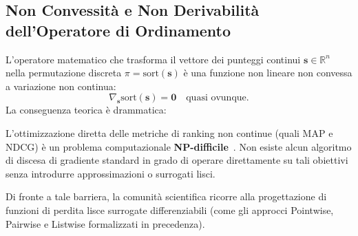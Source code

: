 \FloatBarrier
\subsection{Non Convessit\`a e Non Derivabilit\`a dell'Operatore di Ordinamento}
\label{subsec:non-convessita-non-derivabilita}
L'operatore matematico che trasforma il vettore dei punteggi continui $\mathbf{s} \in \mathbb{R}^n$ nella permutazione discreta $\pi = \text{sort}(\mathbf{s})$ \`e una funzione non lineare non convessa a variazione non continua:
\begin{equation}
\nabla_{\mathbf{s}} \text{sort}(\mathbf{s}) = \mathbf{0} \quad \text{quasi ovunque}.
\end{equation}
La conseguenza teorica \`e drammatica:
\begin{theorem}
L'ottimizzazione diretta delle metriche di ranking non continue (quali MAP e NDCG) \`e un problema computazionale \textbf{NP-difficile}~\cite{bruch2023}. Non esiste alcun algoritmo di discesa di gradiente standard in grado di operare direttamente su tali obiettivi senza introdurre approssimazioni o surrogati lisci.
\end{theorem}

Di fronte a tale barriera, la comunit\`a scientifica ricorre alla progettazione di funzioni di perdita lisce surrogate differenziabili (come gli approcci Pointwise, Pairwise e Listwise formalizzati in precedenza).



